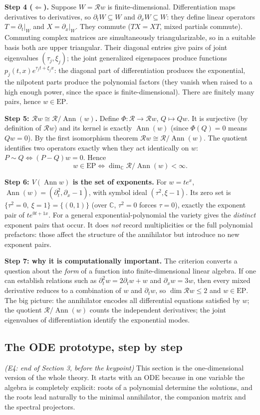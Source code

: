 \documentclass[11pt]{article}
\theoremstyle{plain}
\theoremstyle{definition}
\theoremstyle{remark}
\newcommand{\C}{\mathbb{C}}
\newcommand{\ring}{\mathcal{R}}            %
\DeclareMathOperator{\Ann}{Ann}             %
\newcommand{\Var}{V}                        %
\newcommand{\EP}{\mathrm{EP}}               %
\begin{document}
\medskip\textbf{Step 4 ($\Leftarrow$).} Suppose $W=\ring w$ is finite-dimensional. Differentiation maps derivatives to derivatives, so $\partial_tW\subseteq W$ and $\partial_xW\subseteq W$: they define linear operators $T=\partial_t|_W$ and $X=\partial_x|_W$. They commute ($TX=XT$, mixed partials commute). Commuting complex matrices are simultaneously triangularizable, so in a suitable basis both are upper triangular. Their diagonal entries give pairs of joint eigenvalues $(\tau_j,\xi_j)$; the joint generalized eigenspaces produce functions $p_j(t,x)e^{\tau_jt+\xi_jx}$: the diagonal part of differentiation produces the exponential, the nilpotent parts produce the polynomial factors (they vanish when raised to a high enough power, since the space is finite-dimensional). There are finitely many pairs, hence $w\in\EP$.

\medskip\textbf{Step 5: $\ring w\cong\ring/\Ann(w)$.} Define $\Phi:\ring\to\ring w$, $Q\mapsto Qw$. It is surjective (by definition of $\ring w$) and its kernel is exactly $\Ann(w)$ (since $\Phi(Q)=0$ means $Qw=0$). By the first isomorphism theorem $\ring w\cong\ring/\Ann(w)$. The quotient identifies two operators exactly when they act identically on $w$: $P\sim Q\iff(P-Q)w=0$. Hence
\[
w\in\EP\iff\dim_\C\ring/\Ann(w)<\infty .
\]

\medskip\textbf{Step 6: $\Var(\Ann w)$ is the set of exponents.} For $w=te^x$, $\Ann(w)=(\partial_t^2,\partial_x-1)$, with symbol ideal $(\tau^2,\xi-1)$. Its zero set is $\{\tau^2=0,\ \xi=1\}=\{(0,1)\}$ (over $\C$, $\tau^2=0$ forces $\tau=0$), exactly the exponent pair of $te^{0t+1x}$. For a general exponential-polynomial the variety gives the \emph{distinct} exponent pairs that occur. It does \emph{not} record multiplicities or the full polynomial prefactors: those affect the structure of the annihilator but introduce no new exponent pairs.

\medskip\textbf{Step 7: why it is computationally important.} The criterion converts a question about the \emph{form} of a function into finite-dimensional linear algebra. If one can establish relations such as $\partial_t^2w=2\partial_tw+w$ and $\partial_xw=3w$, then every mixed derivative reduces to a combination of $w$ and $\partial_tw$, so $\dim\ring w\le2$ and $w\in\EP$. The big picture: the annihilator encodes all differential equations satisfied by $w$; the quotient $\ring/\Ann(w)$ counts the independent derivatives; the joint eigenvalues of differentiation identify the exponential modes.

\subsection{The ODE prototype, step by step}\label{expl:E4}
\noindent\emph{(E4: end of Section 3, before the keypoint)}
This section is the one-dimensional version of the whole theory. It starts with an ODE because in one variable the algebra is completely explicit: roots of a polynomial determine the solutions, and the roots lead naturally to the minimal annihilator, the companion matrix and the spectral projectors.
\end{document}
